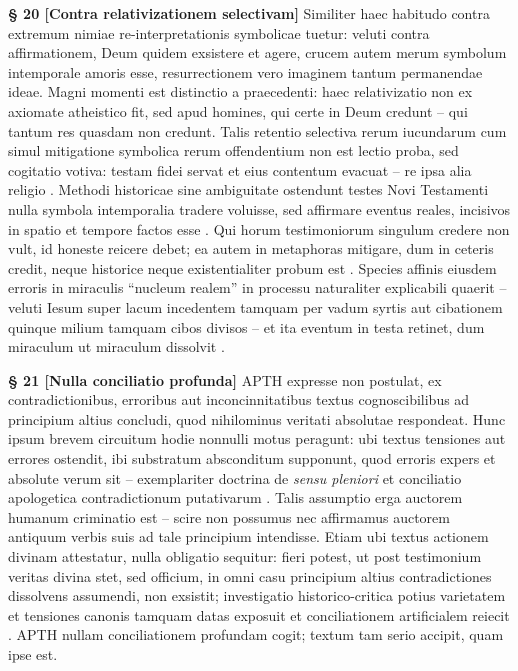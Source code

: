 \documentclass[11pt,a4paper]{article}
\makeatletter
\newcommand{\apth}{{\apthfont APTH}\hspace{0.15em}\xspace}
\newcommand{\apthsec}[3]{%
  \phantomsection%
  \def\@currentlabel{#1}%
  \label{sec:#3}%
  \textbf{§ #1 [#2]}%
}
\makeatother
\begin{document}
\apthsec{20}{Contra relativizationem selectivam}{selektive-relativierung} Similiter haec habitudo contra extremum nimiae re-interpretationis symbolicae tuetur: veluti contra affirmationem, Deum quidem exsistere et agere, crucem autem merum symbolum intemporale amoris esse, resurrectionem vero imaginem tantum permanendae ideae. Magni momenti est distinctio a praecedenti: haec relativizatio non ex axiomate atheistico fit, sed apud homines, qui certe in Deum credunt -- qui tantum res quasdam non credunt. Talis retentio selectiva rerum iucundarum cum simul mitigatione symbolica rerum offendentium non est lectio proba, sed cogitatio votiva: testam fidei servat et eius contentum evacuat -- re ipsa alia religio \citep{machen1923}. Methodi historicae sine ambiguitate ostendunt testes Novi Testamenti nulla symbola intemporalia tradere voluisse, sed affirmare eventus reales, incisivos in spatio et tempore factos esse \citep{wright2003}. Qui horum testimoniorum singulum credere non vult, id honeste reicere debet; ea autem in metaphoras mitigare, dum in ceteris credit, neque historice neque existentialiter probum est \citep{lewis1967,bultmann1941}. Species affinis eiusdem erroris in miraculis ``nucleum realem'' in processu naturaliter explicabili quaerit -- veluti Iesum super lacum incedentem tamquam per vadum syrtis aut cibationem quinque milium tamquam cibos divisos -- et ita eventum in testa retinet, dum miraculum ut miraculum dissolvit \citep{paulus1828}.

\apthsec{21}{Nulla conciliatio profunda}{tiefen-harmonisierung} \apth expresse non postulat, ex contradictionibus, erroribus aut inconcinnitatibus textus cognoscibilibus ad principium altius concludi, quod nihilominus veritati absolutae respondeat. Hunc ipsum brevem circuitum hodie nonnulli motus peragunt: ubi textus tensiones aut errores ostendit, ibi substratum absconditum supponunt, quod erroris expers et absolute verum sit -- exemplariter doctrina de \textit{sensu pleniori} \citep{brown1955} et conciliatio apologetica contradictionum putativarum \citep{archer1982}. Talis assumptio erga auctorem humanum criminatio est -- scire non possumus nec affirmamus auctorem antiquum verbis suis ad tale principium intendisse. Etiam ubi textus actionem divinam attestatur, nulla obligatio sequitur: fieri potest, ut post testimonium veritas divina stet, sed officium, in omni casu principium altius contradictiones dissolvens assumendi, non exsistit; investigatio historico-critica potius varietatem et tensiones canonis tamquam datas exposuit et conciliationem artificialem reiecit \citep{kaesemann1951,dunn1977,enns2005}. \apth nullam conciliationem profundam cogit; textum tam serio accipit, quam ipse est.
\end{document}

